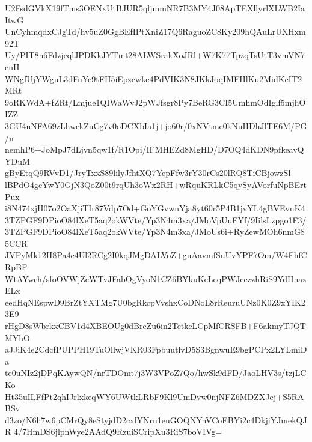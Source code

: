 U2FsdGVkX19fTms3OENxUtBJUR5qljmmNR7B3MY4J08ApTEXllyrlXLWB2IaItwG
UnCyhmqdxCJgTd/hv5uZ0GgBEfIPtXniZ17Q6RaguoZC8Ky209hQAuLrUXHxm92T
Uy/PIT8n6FdzjeqlJPDKkJYTmt28ALWSrakXoJRl+W7K77TpzqTsUtT3vmVN7cnH
WNgfUjYWguL3dFuYc9tFH5iEpzcwke4PdVIK3N8JKkJoqIMFHlKu2MidKcIT2MRt
9oRKWdA+fZRt/Lmjue1QIWaWvJ2pWJfsgr8Py7BeRG3CI5UmhmOdIglf5mjhOIZZ
3GU4uNFA69zLhwckZuCg7v0oDCXbIa1j+jo60r/0xNVtmc0kNuHDhJlTE6M/PG/n
nemhP6+JoMpJ7dLjvn5qw1f/R1Opi/IFMHEZd8MgHD/D7OQ4dKDN9pfkeavQYDuM
gByEtqQ9RVvD1/JryTxxS89lilyJfhtXQ7YepFfw3rY30rCs20lRQ8TiCBjowzSl
lBPdO4gcYwY0GjN3QoZ00t9rqUh3oWx2RH+wRquKRLkC5qySyAVorfuNpBErtPux
i8N474xjH07o2OaXjiTIr87Vdp7Od+GoYGvwnYja8yt60r5P4B1jvYL4gBVEvnK4
3TZPGF9DPioO84lXeT5aq2okWVte/Yp3N4m3xa/JMoVpUuFYf/9IilsLzpgo1F3/
3TZPGF9DPioO84lXeT5aq2okWVte/Yp3N4m3xa/JMoUs6i+RyZewMOh6nmG85CCR
JVPyMk12H8Pa4c4Ul2RCg2I0kqJMgDALVoZ+guAavmfSuUvYPF7Om/W4FhfCRpBF
WtAYwch/sfoOVWjZcWTvJFabOgVyoN1CZ6BYkuKeLcqPWJcezzhRiS9YdHnazELx
eedHqNEspwD9BrZtYXTMg7U0bgRkcpVvshxCoDNoL8rReuruUNz0K0Z9xYIK23E9
rHgD8sWbrkxCBV1d4XBEOUg0dBreZu6in2TetkcLCpMfCRSFB+F6akmyTJQTMYhO
aJJiK4e2CdcfPUPPH19TuOllwjVKR03FpbuutlvD5S3BgnwuE9bgPCPx2LYLmiDa
te0uNIz2jDPqKAywQN/nrTDOmt7j3W3VPoZ7Qo/hwSk9dFD/JaoLHV3s/tzjLCKo
Ht35uILFfPt2qhIJrlxkeqWY6UWtkLRbF9Kl9UmDvw0njNFZ6MDZXJej+S5RABSv
d3zo/N6h7w6pCMrQy8eStyjdD2cxlYNrn1euGOQNYnVCoEBYi2c4DkjiYJmekQJR
4/7HmDS6jlpnWye2AAdQ9RzuiSCripXu3RiS7boVIVg=
